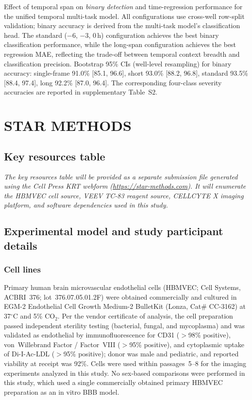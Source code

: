 \documentclass[12pt,letterpaper]{article}
\begin{document}
Effect of temporal span on \emph{binary detection} and time-regression performance for the unified temporal multi-task model.
All configurations use cross-well row-split validation; binary accuracy is derived from the multi-task model's classification head.
The standard ($-$6, $-$3, 0\,h) configuration achieves the best binary classification performance, while the long-span configuration achieves the best regression MAE, reflecting the trade-off between temporal context breadth and classification precision.
Bootstrap 95\% CIs (well-level resampling) for binary accuracy: single-frame 91.0\% [85.1, 96.6], short 93.0\% [88.2, 96.8], standard 93.5\% [88.4, 97.4], long 92.2\% [87.0, 96.4].
The corresponding four-class severity accuracies are reported in supplementary Table~S2.




\section*{STAR METHODS}

\subsection*{Key resources table}

\textit{The key resources table will be provided as a separate submission file generated using the Cell Press KRT webform (\url{https://star-methods.com}).
It will enumerate the HBMVEC cell source, VEEV TC-83 reagent source, CELLCYTE X imaging platform, and software dependencies used in this study.}

\subsection*{Experimental model and study participant details}

\subsubsection*{Cell lines}

Primary human brain microvascular endothelial cells (HBMVEC; Cell Systems, ACBRI~376; lot~376.07.05.01.2F) were obtained commercially and cultured in EGM-2 Endothelial Cell Growth Medium-2 BulletKit (Lonza, Cat\# CC-3162) at 37$^{\circ}$C and 5\% CO$_2$.
Per the vendor certificate of analysis, the cell preparation passed independent sterility testing (bacterial, fungal, and mycoplasma) and was validated as endothelial by immunofluorescence for CD31 ($>$98\% positive), von~Willebrand Factor / Factor~VIII ($>$95\% positive), and cytoplasmic uptake of Di-I-Ac-LDL ($>$95\% positive); donor was male and pediatric, and reported viability at receipt was 92\%.
Cells were used within passages~5--8 for the imaging experiments analyzed in this study.
No sex-based comparisons were performed in this study, which used a single commercially obtained primary HBMVEC preparation as an in vitro BBB model.
\end{document}
